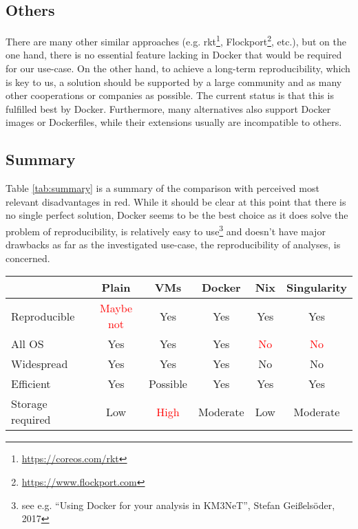 \documentclass[a4paper, twoside, 11pt]{article}
\begin{document}
\subsection{Others}
There are many other similar approaches 
(e.g. rkt\footnote{\url{https://coreos.com/rkt}}, Flockport\footnote{\url{https://www.flockport.com}}, etc.), 
but on the one hand, there is no essential feature lacking in Docker that would be required 
for our use-case. 
On the other hand, to achieve a long-term reproducibility, which is key to us, 
a solution should be supported by a large community and as many other cooperations or companies as possible. 
The current status is that this is fulfilled best by Docker. 
Furthermore, many alternatives also support Docker images or Dockerfiles, while their extensions usually are incompatible to others. 


\subsection{Summary}

Table \ref{tab:summary} is a summary of the comparison with perceived most relevant disadvantages in red.  
While it should be clear at this point that there is no single perfect solution, 
Docker seems to be the best choice as it does solve the problem of reproducibility, 
is relatively easy to use\footnote{see e.g. ``Using Docker for your analysis in KM3NeT'', Stefan Geißelsöder, 2017}
and doesn't have major drawbacks as far as the investigated use-case, the reproducibility of analyses, is concerned. 


\begin{center}
\begin{tabular}{ l | c | c | c | c | c }
\label{tab:summary}
      & Plain 	& VMs 	& Docker 	& Nix 	& Singularity \\
  \hline
  Reproducible & \textcolor{red}{Maybe not} 	& Yes 	& Yes		& Yes	& Yes \\
  \hline
  All OS & Yes 	& Yes 	& Yes		& \textcolor{red}{No}	& \textcolor{red}{No} \\
  \hline
  Widespread & Yes & Yes & Yes & No & No \\
  \hline
  Efficient & Yes & Possible & Yes & Yes & Yes \\
  \hline
  Storage required & Low & \textcolor{red}{High} & Moderate & Low & Moderate \\
\end{tabular}
\end{center}
\end{document}
